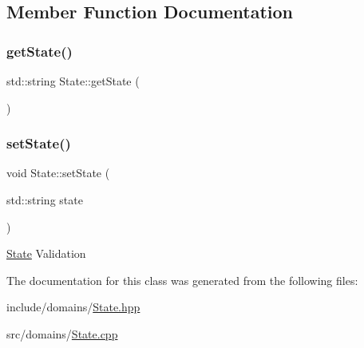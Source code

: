 \subsection{Member Function Documentation}
\mbox{\label{class_state_ad8697cb367f8b1453a1412426fc248ae}} 
\subsubsection{\texorpdfstring{getState()}{getState()}}
{\footnotesize\ttfamily std\+::string State\+::get\+State (\begin{DoxyParamCaption}{ }\end{DoxyParamCaption})}

\mbox{\label{class_state_ad267a860927ae9032e808d06d5fc9d30}} 
\subsubsection{\texorpdfstring{setState()}{setState()}}
{\footnotesize\ttfamily void State\+::set\+State (\begin{DoxyParamCaption}\item[{std\+::string}]{state }\end{DoxyParamCaption})}

\mbox{\hyperlink{class_state}{State}} Validation 

The documentation for this class was generated from the following files\+:\begin{DoxyCompactItemize}
\item 
include/domains/\mbox{\hyperlink{_state_8hpp}{State.\+hpp}}\item 
src/domains/\mbox{\hyperlink{_state_8cpp}{State.\+cpp}}\end{DoxyCompactItemize}

